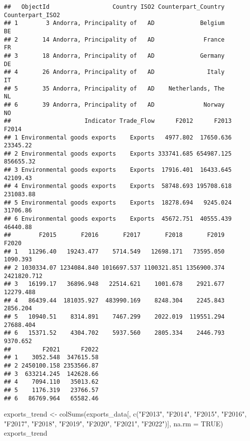 \documentclass[
]{article}
\newenvironment{Shaded}{\begin{snugshade}}{\end{snugshade}}
\newcommand{\AttributeTok}[1]{\textcolor[rgb]{0.77,0.63,0.00}{#1}}
\newcommand{\ConstantTok}[1]{\textcolor[rgb]{0.00,0.00,0.00}{#1}}
\newcommand{\FunctionTok}[1]{\textcolor[rgb]{0.00,0.00,0.00}{#1}}
\newcommand{\NormalTok}[1]{#1}
\newcommand{\OtherTok}[1]{\textcolor[rgb]{0.56,0.35,0.01}{#1}}
\newcommand{\StringTok}[1]{\textcolor[rgb]{0.31,0.60,0.02}{#1}}
\begin{document}
\begin{verbatim}
##   ObjectId                  Country ISO2 Counterpart_Country Counterpart_ISO2
## 1        3 Andorra, Principality of   AD             Belgium               BE
## 2       14 Andorra, Principality of   AD              France               FR
## 3       18 Andorra, Principality of   AD             Germany               DE
## 4       26 Andorra, Principality of   AD               Italy               IT
## 5       35 Andorra, Principality of   AD    Netherlands, The               NL
## 6       39 Andorra, Principality of   AD              Norway               NO
##                     Indicator Trade_Flow      F2012      F2013     F2014
## 1 Environmental goods exports    Exports   4977.802  17650.636  23345.22
## 2 Environmental goods exports    Exports 333741.685 654987.125 856655.32
## 3 Environmental goods exports    Exports  17916.401  16433.645  42109.43
## 4 Environmental goods exports    Exports  58748.693 195708.618 231083.88
## 5 Environmental goods exports    Exports  18278.694   9245.024  31706.86
## 6 Environmental goods exports    Exports  45672.751  40555.439  46440.88
##        F2015       F2016       F2017       F2018       F2019       F2020
## 1   11296.40   19243.477    5714.549   12698.171   73595.050    1090.393
## 2 1030334.07 1234084.840 1016697.537 1100321.851 1356900.374 2421820.712
## 3   16199.17   36896.948   22514.621    1001.678    2921.677   12279.488
## 4   86439.44  181035.927  483990.169    8248.304    2245.843    2856.204
## 5   10940.51    8314.891    7467.299    2022.019  119551.294   27688.404
## 6   15371.52    4304.702    5937.560    2805.334    2446.793    9370.652
##         F2021      F2022
## 1    3052.548  347615.58
## 2 2450100.158 2353566.87
## 3  633214.245  142628.66
## 4    7094.110   35013.62
## 5    1176.319   23766.57
## 6   86769.964   65582.46
\end{verbatim}

\begin{Shaded}
\begin{Highlighting}[]
\NormalTok{exports\_trend }\OtherTok{\textless{}{-}} \FunctionTok{colSums}\NormalTok{(exports\_data[, }\FunctionTok{c}\NormalTok{(}\StringTok{"F2013"}\NormalTok{, }\StringTok{"F2014"}\NormalTok{, }\StringTok{"F2015"}\NormalTok{, }\StringTok{"F2016"}\NormalTok{, }\StringTok{"F2017"}\NormalTok{, }\StringTok{"F2018"}\NormalTok{, }\StringTok{"F2019"}\NormalTok{, }\StringTok{"F2020"}\NormalTok{, }\StringTok{"F2021"}\NormalTok{, }\StringTok{"F2022"}\NormalTok{)], }\AttributeTok{na.rm =} \ConstantTok{TRUE}\NormalTok{)}
\NormalTok{exports\_trend }
\end{Highlighting}
\end{Shaded}
\end{document}
